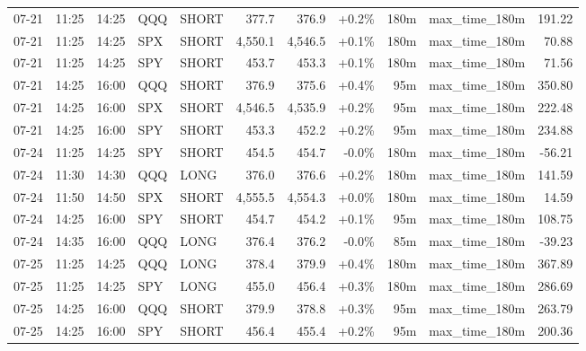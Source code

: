 \documentclass[11pt,a4paper,twoside]{article}
\begin{document}
\begin{center}
\begin{longtable}{>{\color{txtmain}}l l l l l r r r r >{\color{txtmain}}l r}
07-21 & 11:25 & 14:25 & QQQ & SHORT & 377.7 & 376.9 & \textcolor{wingreen}{+0.2\%} & 180m & max\_time\_180m & \textcolor{wingreen}{191.22} \\
07-21 & 11:25 & 14:25 & SPX & SHORT & 4,550.1 & 4,546.5 & \textcolor{wingreen}{+0.1\%} & 180m & max\_time\_180m & \textcolor{wingreen}{70.88} \\
07-21 & 11:25 & 14:25 & SPY & SHORT & 453.7 & 453.3 & \textcolor{wingreen}{+0.1\%} & 180m & max\_time\_180m & \textcolor{wingreen}{71.56} \\
07-21 & 14:25 & 16:00 & QQQ & SHORT & 376.9 & 375.6 & \textcolor{wingreen}{+0.4\%} & 95m & max\_time\_180m & \textcolor{wingreen}{350.80} \\
07-21 & 14:25 & 16:00 & SPX & SHORT & 4,546.5 & 4,535.9 & \textcolor{wingreen}{+0.2\%} & 95m & max\_time\_180m & \textcolor{wingreen}{222.48} \\
07-21 & 14:25 & 16:00 & SPY & SHORT & 453.3 & 452.2 & \textcolor{wingreen}{+0.2\%} & 95m & max\_time\_180m & \textcolor{wingreen}{234.88} \\
07-24 & 11:25 & 14:25 & SPY & SHORT & 454.5 & 454.7 & \textcolor{lossred}{-0.0\%} & 180m & max\_time\_180m & \textcolor{lossred}{-56.21} \\
07-24 & 11:30 & 14:30 & QQQ & LONG & 376.0 & 376.6 & \textcolor{wingreen}{+0.2\%} & 180m & max\_time\_180m & \textcolor{wingreen}{141.59} \\
07-24 & 11:50 & 14:50 & SPX & SHORT & 4,555.5 & 4,554.3 & \textcolor{wingreen}{+0.0\%} & 180m & max\_time\_180m & \textcolor{wingreen}{14.59} \\
07-24 & 14:25 & 16:00 & SPY & SHORT & 454.7 & 454.2 & \textcolor{wingreen}{+0.1\%} & 95m & max\_time\_180m & \textcolor{wingreen}{108.75} \\
07-24 & 14:35 & 16:00 & QQQ & LONG & 376.4 & 376.2 & \textcolor{lossred}{-0.0\%} & 85m & max\_time\_180m & \textcolor{lossred}{-39.23} \\
07-25 & 11:25 & 14:25 & QQQ & LONG & 378.4 & 379.9 & \textcolor{wingreen}{+0.4\%} & 180m & max\_time\_180m & \textcolor{wingreen}{367.89} \\
07-25 & 11:25 & 14:25 & SPY & LONG & 455.0 & 456.4 & \textcolor{wingreen}{+0.3\%} & 180m & max\_time\_180m & \textcolor{wingreen}{286.69} \\
07-25 & 14:25 & 16:00 & QQQ & SHORT & 379.9 & 378.8 & \textcolor{wingreen}{+0.3\%} & 95m & max\_time\_180m & \textcolor{wingreen}{263.79} \\
07-25 & 14:25 & 16:00 & SPY & SHORT & 456.4 & 455.4 & \textcolor{wingreen}{+0.2\%} & 95m & max\_time\_180m & \textcolor{wingreen}{200.36} \\

\end{longtable}
\end{center}
\end{document}
